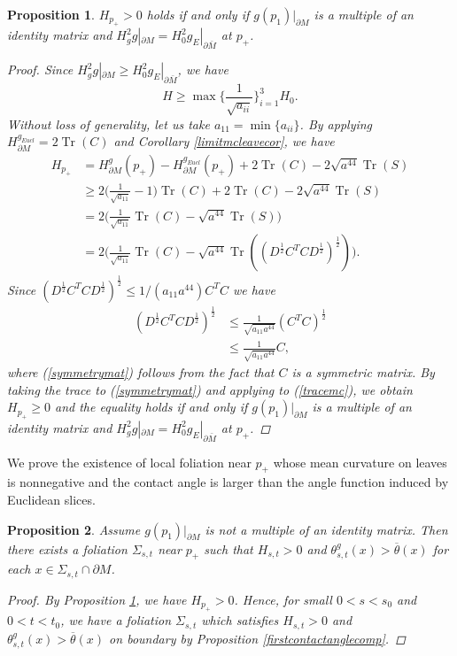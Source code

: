 \documentclass[11pt,letterpaper]{amsart}
\DeclareMathOperator{\Tr}{Tr}
\newtheorem{prop}{Proposition}[section]
\begin{document}
\begin{prop} \label{posmc} $H_{p_{+}}>0$ holds if and only if $g(p_{1})|_{\partial M}$ is a multiple of an identity matrix and $H_g^2g|_{\partial M}=H_0^2g_{E}|_{\partial \bar{M}}$ at $p_{+}$. 
\begin{proof}
Since $H_g^2g|_{\partial M}\geq H_0^2g_{E}|_{\partial \bar{M}}$, we have
\begin{equation*}
    H \ge \max \bigg \{ \frac{1}{\sqrt{a_{ii}}} \bigg \}_{i=1}^{3} H_{0}.
\end{equation*}
Without loss of generality, let us take $a_{11} = \min \{ a_{ii} \}$. By applying $H_{\partial M}^{g_{Eucl}} = 2 \Tr(C)$ and Corollary \ref{limitmcleavecor}, we have
\begin{align} \nonumber H_{p_{+}} &= H^{g}_{\partial M}(p_{+}) - H^{g_{Eucl}}_{\partial M}(p_{+}) +   2 \Tr(C) -  2 \sqrt{a^{44}} \Tr(S)  \\
\nonumber &\ge 2 \bigg( \frac{1}{\sqrt{a_{11}}} -1 \bigg) \Tr(C) +   2 \Tr(C) -  2 \sqrt{a^{44}} \Tr(S)  \\ &= \nonumber 2 \bigg( \frac{1}{\sqrt{a_{11}}} \Tr(C) - \sqrt{a^{44}} \Tr(S)  \bigg) \\&= \label{tracemc} 2 \bigg( \frac{1}{\sqrt{a_{11}}} \Tr(C) - \sqrt{a^{44}} \Tr\left( \left(D^{\frac{1}{2}}C^TCD^{\frac{1}{2}}\right)^{\frac{1}{2}} \right)  \bigg).
\end{align}
Since $\left(D^{\frac{1}{2}}C^TCD^{\frac{1}{2}}\right)^{\frac{1}{2}} \le 1/ (a_{11} a^{44}) C^TC$ we have
\begin{align} \nonumber
    \left(D^{\frac{1}{2}}C^TCD^{\frac{1}{2}}\right)^{\frac{1}{2}} &\le \frac{1}{\sqrt{a_{11} a^{44}}} \left( C^TC \right)^\frac{1}{2} \\ \label{symmetrymat} &\le \frac{1}{\sqrt{a_{11} a^{44}}} C,
\end{align}
where (\ref{symmetrymat}) follows from the fact that $C$ is a symmetric matrix. By taking the trace to (\ref{symmetrymat}) and applying to 
(\ref{tracemc}), we obtain $H_{p_{+}} \ge 0$ and the equality holds if and only if $g(p_{1})|_{\partial M}$ is a multiple of an identity matrix and $H_g^2g|_{\partial M}=H_0^2g_{E}|_{\partial \bar{M}}$ at $p_{+}$.
\end{proof}
\end{prop}
We prove the existence of local foliation near $p_{+}$ whose mean curvature on leaves is nonnegative and the contact angle is larger than the angle function induced by Euclidean slices.
\begin{prop} \label{nonzeromcfoliation}
Assume $g(p_{1})|_{\partial M}$ is not a multiple of an identity matrix. Then there exists a foliation $\Sigma_{s,t}$ near $p_{+}$ such that $H_{s,t}>0$ and $\theta_{s,t}^{g}(x) > \overline{\theta}(x)$ for each $x \in \Sigma_{s,t} \cap \partial M$.
\begin{proof} By Proposition \ref{posmc}, we have $H_{p_{+}}>0$. Hence, for small $0<s<s_{0}$ and $0<t<t_{0}$, we have a foliation $\Sigma_{s,t}$ which satisfies $H_{s,t}>0$ and $\theta_{s,t}^{g}(x) > \overline{\theta}(x)$ on boundary by Proposition \ref{firstcontactanglecomp}.
\end{proof}
\end{prop}
\end{document}
